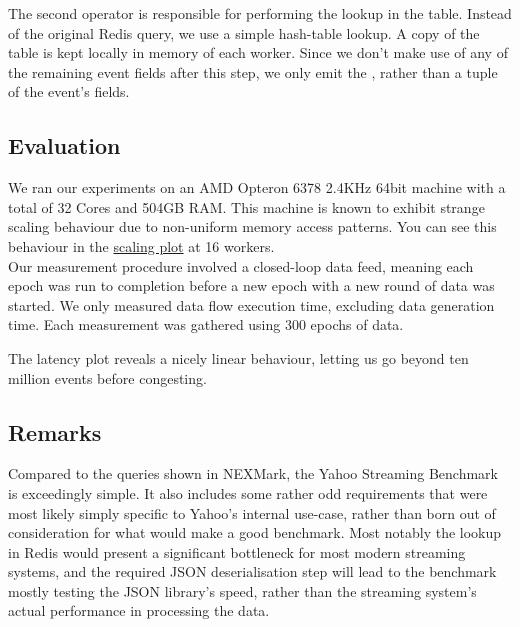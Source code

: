 The second  operator is responsible for performing the lookup in the  table. Instead of the original Redis query, we use a simple hash-table lookup. A copy of the table is kept locally in memory of each worker. Since we don't make use of any of the remaining event fields after this step, we only emit the , rather than a tuple of the event's fields.

\subsection{Evaluation}
We ran our experiments on an AMD Opteron 6378 2.4KHz 64bit machine with a total of 32 Cores and 504GB RAM. This machine is known to exhibit strange scaling behaviour due to non-uniform memory access patterns. You can see this behaviour in the \hyperref[figure:ysb-scaling]{scaling plot} at 16 workers. \\

Our measurement procedure involved a closed-loop data feed, meaning each epoch was run to completion before a new epoch with a new round of data was started. We only measured data flow execution time, excluding data generation time. Each measurement was gathered using 300 epochs of data. \\




The latency plot reveals a nicely linear behaviour, letting us go beyond ten million events before congesting.

\subsection{Remarks}\label{section:ysb-remarks}
Compared to the queries shown in NEXMark, the Yahoo Streaming Benchmark is exceedingly simple. It also includes some rather odd requirements that were most likely simply specific to Yahoo's internal use-case, rather than born out of consideration for what would make a good benchmark. Most notably the lookup in Redis would present a significant bottleneck for most modern streaming systems, and the required JSON deserialisation step will lead to the benchmark mostly testing the JSON library's speed, rather than the streaming system's actual performance in processing the data. \\


